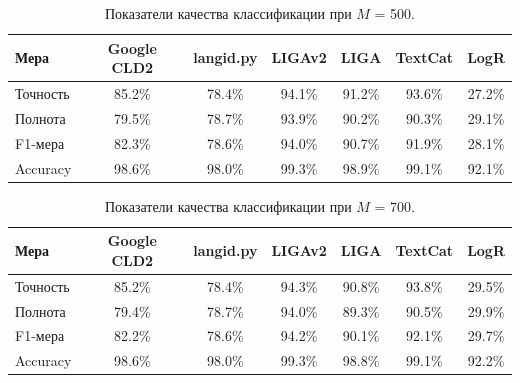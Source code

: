 \documentclass[a4paper, 14pt]{article}
\begin{document}
\begin{center}
\begin{table}[h]
\begin{tabular*}{0.954\textwidth}{| l| *{6}{|c} |}
\hline 
Мера & Google CLD2 & langid.py & LIGAv2 & LIGA & TextCat  & LogR\\
\hline
Точность & 85.2\% & 78.4\% & 94.1\% & 91.2\% & 93.6\% & 27.2\%\\
Полнота & 79.5\% & 78.7\% & 93.9\% & 90.2\% & 90.3\% & 29.1\%\\
F1-мера & 82.3\% & 78.6\% & 94.0\% & 90.7\% & 91.9\% & 28.1\%\\
Accuracy & 98.6\% & 98.0\% & 99.3\% & 98.9\% & 99.1\% & 92.1\%\\
\hline
\end{tabular*}
\caption{Показатели качества классификации при $M$ = 500.}
\end{table}
\end{center}

\begin{center}
\begin{table}[h]
\begin{tabular*}{0.954\textwidth}{| l| *{6}{|c} |}
\hline 
Мера & Google CLD2 & langid.py & LIGAv2 & LIGA & TextCat  & LogR\\
\hline
Точность & 85.2\% & 78.4\% & 94.3\% & 90.8\% & 93.8\% & 29.5\%\\
Полнота & 79.4\% & 78.7\% & 94.0\% & 89.3\% & 90.5\% & 29.9\%\\
F1-мера & 82.2\% & 78.6\% & 94.2\% & 90.1\% & 92.1\% & 29.7\%\\
Accuracy & 98.6\% & 98.0\% & 99.3\% & 98.8\% & 99.1\% & 92.2\%\\
\hline
\end{tabular*}
\caption{Показатели качества классификации при $M$ = 700.}
\end{table}
\end{center}
\end{document}
